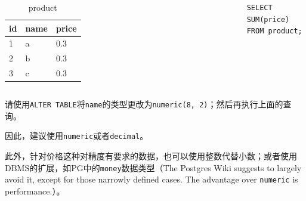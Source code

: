 \documentclass[aspectratio=169, 14pt]{beamer}
\begin{document}
\begin{frame}[fragile]

    \begin{columns}
        \begin{table}
            \caption*{product}
            \begin{tabular}{lll}
              \toprule
              id & name & price \\
              \midrule
              1 & a & 0.3 \\
              2 & b & 0.3 \\
              3 & c & 0.3 \\
              \bottomrule
            \end{tabular}
        \end{table}
        \begin{verbatim}
SELECT SUM(price) 
FROM product;
        \end{verbatim}
    \end{columns}
    
 请使用\texttt{ALTER TABLE}将\texttt{name}的类型更改为\texttt{numeric(8, 2)}；然后再执行上面的查询。
\end{frame}

\begin{frame}
因此，建议使用\texttt{numeric}或者\texttt{decimal}。


此外，针对价格这种对精度有要求的数据，也可以使用整数代替小数；或者使用DBMS的扩展，如PG中的\texttt{money}数据类型（The Postgres Wiki suggests to largely avoid it, except for those narrowly defined cases. The advantage over \texttt{numeric} is performance.）。
\end{frame}
\end{document}
